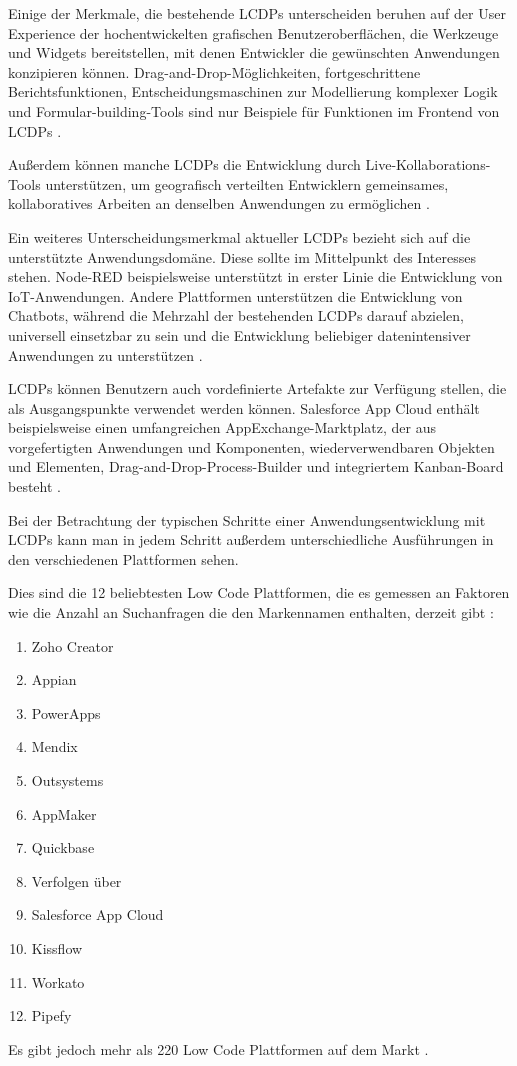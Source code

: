 \documentclass[12pt]{article} %
\begin{document}
	Einige der Merkmale, die bestehende LCDPs unterscheiden beruhen auf der User Experience der hochentwickelten grafischen Benutzeroberflächen, die Werkzeuge und Widgets bereitstellen, mit denen Entwickler die gewünschten Anwendungen konzipieren können. Drag-and-Drop-Möglichkeiten, fortgeschrittene Berichtsfunktionen, Entscheidungsmaschinen zur Modellierung komplexer Logik und Formular-building-Tools sind nur Beispiele für Funktionen im Frontend von LCDPs \autocite{DiRuscio.2022}. \newline
	
	Außerdem können manche LCDPs die Entwicklung durch Live-Kollaborations-Tools unterstützen, um geografisch verteilten Entwicklern gemeinsames, kollaboratives Arbeiten an denselben Anwendungen zu ermöglichen \autocite{DiRuscio.2022}. \newline
	
	Ein weiteres Unterscheidungsmerkmal aktueller LCDPs bezieht sich auf die unterstützte Anwendungsdomäne. Diese sollte im Mittelpunkt des Interesses stehen. Node-RED beispielsweise unterstützt in erster Linie die Entwicklung von IoT-Anwendungen. Andere Plattformen unterstützen die Entwicklung von Chatbots, während die Mehrzahl der bestehenden LCDPs darauf abzielen, universell einsetzbar zu sein und die Entwicklung beliebiger datenintensiver Anwendungen zu unterstützen \autocite{DiRuscio.2022}. \newline
	
	LCDPs können Benutzern auch vordefinierte Artefakte zur Verfügung stellen, die als Ausgangspunkte verwendet werden können. Salesforce App Cloud enthält beispielsweise einen umfangreichen AppExchange-Marktplatz, der aus vorgefertigten Anwendungen und Komponenten, wiederverwendbaren Objekten und Elementen, Drag-and-Drop-Process-Builder und integriertem Kanban-Board besteht \autocite{DiRuscio.2022}. \newline
	
	Bei der Betrachtung der typischen Schritte einer Anwendungsentwicklung mit LCDPs kann man in jedem Schritt außerdem unterschiedliche Ausführungen in den verschiedenen Plattformen sehen. \newline
	
	Dies sind die 12 beliebtesten Low Code Plattformen, die es gemessen an Faktoren wie die Anzahl an Suchanfragen die den Markennamen enthalten, derzeit gibt \autocite{KevinShuler.2023}: 
	\begin{enumerate}
	\item Zoho Creator
	\item Appian
	\item PowerApps
	\item Mendix
	\item Outsystems
	\item AppMaker
	\item Quickbase
	\item Verfolgen über
	\item Salesforce App Cloud
	\item Kissflow
	\item Workato
	\item Pipefy
	\end{enumerate}
	Es gibt jedoch mehr als 220 Low Code Plattformen auf dem Markt \autocite{KevinShuler.2023}. 
	
\end{document}
